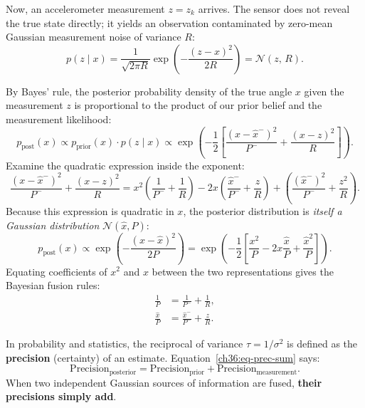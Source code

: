Now, an accelerometer measurement $z = z_k$ arrives. The sensor does not reveal the true state directly; it yields an observation contaminated by zero-mean Gaussian measurement noise of variance $R$:
\begin{equation}
  p(z \mid x) = \frac{1}{\sqrt{2\pi R}} \exp\left( -\frac{(z - x)^2}{2 R} \right) = \mathcal{N}(z,\, R) .
  \label{ch36:eq-meas-gauss}
\end{equation}

By Bayes' rule, the posterior probability density of the true angle $x$ given the measurement $z$ is proportional to the product of our prior belief and the measurement likelihood:
\begin{equation}
  p_{\text{post}}(x) \propto p_{\text{prior}}(x) \cdot p(z \mid x) \propto \exp\left( -\frac{1}{2} \left[ \frac{(x - \hat{x}^-)^2}{P^-} + \frac{(x - z)^2}{R} \right] \right) .
  \label{ch36:eq-bayes-product}
\end{equation}
Examine the quadratic expression inside the exponent:
\begin{equation}
  \frac{(x - \hat{x}^-)^2}{P^-} + \frac{(x - z)^2}{R} = x^2 \left( \frac{1}{P^-} + \frac{1}{R} \right) - 2x \left( \frac{\hat{x}^-}{P^-} + \frac{z}{R} \right) + \left( \frac{(\hat{x}^-)^2}{P^-} + \frac{z^2}{R} \right) .
  \label{ch36:eq-quadratic-expand}
\end{equation}
Because this expression is quadratic in $x$, the posterior distribution is \emph{itself a Gaussian distribution} $\mathcal{N}(\hat{x}, P)$:
\begin{equation}
  p_{\text{post}}(x) \propto \exp\left( -\frac{(x - \hat{x})^2}{2 P} \right) = \exp\left( -\frac{1}{2} \left[ \frac{x^2}{P} - 2x \frac{\hat{x}}{P} + \frac{\hat{x}^2}{P} \right] \right) .
\end{equation}
Equating coefficients of $x^2$ and $x$ between the two representations gives the Bayesian fusion rules:
\begin{align}
  \frac{1}{P} &= \frac{1}{P^-} + \frac{1}{R} , \label{ch36:eq-prec-sum} \\
  \frac{\hat{x}}{P} &= \frac{\hat{x}^-}{P^-} + \frac{z}{R} . \label{ch36:eq-mean-prec}
\end{align}

In probability and statistics, the reciprocal of variance $\tau = 1/\sigma^2$ is defined as the \textbf{precision} (certainty) of an estimate. Equation~\eqref{ch36:eq-prec-sum} says:
\begin{equation}
  \text{Precision}_{\text{posterior}} = \text{Precision}_{\text{prior}} + \text{Precision}_{\text{measurement}} .
\end{equation}
When two independent Gaussian sources of information are fused, \textbf{their precisions simply add}.

